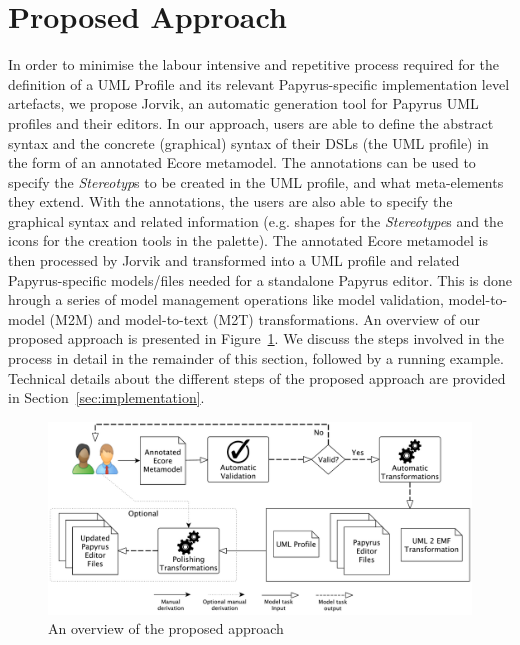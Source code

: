 \section{Proposed Approach}
\label{sec:approach}

In order to minimise the labour intensive and repetitive process required for the definition of a UML Profile and its relevant Papyrus-specific implementation level artefacts, we propose Jorvik, an automatic generation tool for Papyrus UML profiles and their editors. 
In our approach, users are able to define the abstract syntax and the concrete (graphical) syntax of their DSLs (the UML profile) in the form of an annotated Ecore metamodel.
The annotations can be used to specify the \textit{Stereotyp}s to be created in the UML profile, and what meta-elements they extend. 
With the annotations, the users are also able to specify the graphical syntax and related information (e.g. shapes for the \textit{Stereotype}s and the icons for the creation tools in the palette). 
The annotated Ecore metamodel is then processed by Jorvik and transformed into a UML profile and related Papyrus-specific models/files needed for a standalone Papyrus editor. This is done hrough a series of model management operations like model validation, model-to-model (M2M) and model-to-text (M2T) transformations. An overview of our proposed approach is presented in Figure~\ref{fig:approachOverview}. 
We discuss the steps involved in the process in detail in the remainder of this section, followed by a running example. 
Technical details about the different steps of the proposed approach are provided in Section~\ref{sec:implementation}.

\begin{figure}[ht!]
	\centering
	\includegraphics[width=1\textwidth]{diagrams/approachOverview.pdf}
	\caption[]{An overview of the proposed approach}
	\label{fig:approachOverview}
\end{figure}

